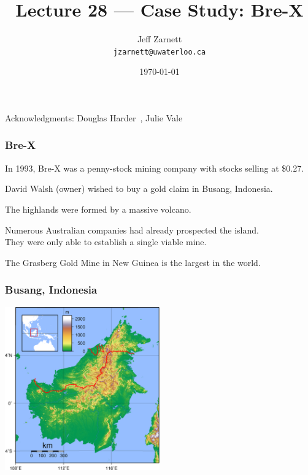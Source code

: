 

\title{Lecture 28 --- Case Study: Bre-X }

\author{Jeff Zarnett \\ \small \texttt{jzarnett@uwaterloo.ca}}
\date{\today}




\begin{frame}
  \titlepage

\begin{center}
  \small{Acknowledgments: Douglas Harder~\cite{dwh}, Julie Vale~\cite{jv}}
  \end{center}
\end{frame}



\begin{frame}
\frametitle{Bre-X}

In 1993, Bre-X was a penny-stock mining company with stocks selling at \$0.27.

David Walsh (owner) wished to buy a gold claim in Busang, Indonesia.

The highlands were formed by a massive volcano.

Numerous Australian companies had already prospected the island.\\
\quad They were only able to establish a single viable mine.

The Grasberg Gold Mine in New Guinea is the largest in the world.

\end{frame}



\begin{frame}
\frametitle{Busang, Indonesia}

\begin{center}
	\includegraphics[width=0.5\textwidth]{images/busang.png}
\end{center}

\end{frame}



